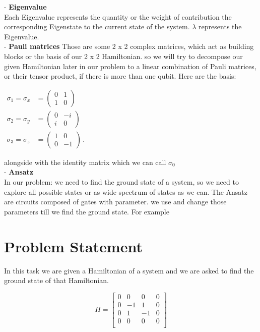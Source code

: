 \documentclass[11pt]{article}
\begin{document}
{	- \textbf{Eigenvalue}\\
	{\addtolength{\leftskip}{7mm}
	Each Eigenvalue represents the quantity or the weight of contribution the corresponding Eigenstate to the current state of the system. $\lambda$ represents the Eigenvalue.
	}\\

	- \textbf{Pauli matrices}
	Those are some 2 x 2 complex matrices, which act as building blocks or the basis of our 2 x 2 Hamiltonian. so we will try to decompose our given Hamiltonian later in our problem to a linear combination of Pauli matrices, or their tensor product, if there is more than one qubit. Here are the basis:
	
	${\begin{aligned}\sigma _{1}=\sigma _{x}&={\begin{pmatrix}0&1\\1&0\end{pmatrix}}\\\sigma _{2}=\sigma _{y}&={\begin{pmatrix}0&-i\\i&0\end{pmatrix}}\\\sigma _{3}=\sigma _{z}&={\begin{pmatrix}1&0\\0&-1\end{pmatrix}}\,.\end{aligned}}$
	
	alongside with the identity matrix which we can call $\sigma_{0}$\\
	
	
	- \textbf{Ansatz}\\
	In our problem: we need to find the ground state of a system, so we need to explore all possible states or as wide spectrum of states as we can. The Ansatz are circuits composed of gates with parameter. we use and change those parameters till we find the ground state. For example
	
	
	 

   	}
	
	
	\section*{Problem Statement}
	{\addtolength{\leftskip}{7mm}
		In this task we are given a Hamiltonian of a system and we are asked to find the ground state of that Hamiltonian.
		
		\begin{equation*}
		H = 
		\begin{bmatrix}
		0 & 0 & 0 & 0\\
		0 & -1 & 1 & 0 \\
		0 & 1 & -1 & 0 \\
		0 & 0 & 0 & 0\\
		\end{bmatrix}
		\end{equation*}
		
	}
\end{document}

